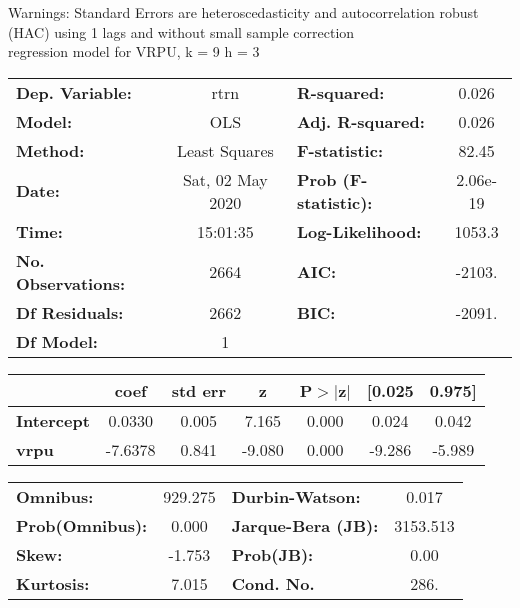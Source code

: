 Warnings: \newline
 [1] Standard Errors are heteroscedasticity and autocorrelation robust (HAC) using 1 lags and without small sample correction\\ 

regression model for VRPU, k = 9 h = 3\begin{center}
\begin{tabular}{lclc}
\toprule
\textbf{Dep. Variable:}    &       rtrn       & \textbf{  R-squared:         } &     0.026   \\
\textbf{Model:}            &       OLS        & \textbf{  Adj. R-squared:    } &     0.026   \\
\textbf{Method:}           &  Least Squares   & \textbf{  F-statistic:       } &     82.45   \\
\textbf{Date:}             & Sat, 02 May 2020 & \textbf{  Prob (F-statistic):} &  2.06e-19   \\
\textbf{Time:}             &     15:01:35     & \textbf{  Log-Likelihood:    } &    1053.3   \\
\textbf{No. Observations:} &        2664      & \textbf{  AIC:               } &    -2103.   \\
\textbf{Df Residuals:}     &        2662      & \textbf{  BIC:               } &    -2091.   \\
\textbf{Df Model:}         &           1      & \textbf{                     } &             \\
\bottomrule
\end{tabular}
\begin{tabular}{lcccccc}
                   & \textbf{coef} & \textbf{std err} & \textbf{z} & \textbf{P$> |$z$|$} & \textbf{[0.025} & \textbf{0.975]}  \\
\midrule
\textbf{Intercept} &       0.0330  &        0.005     &     7.165  &         0.000        &        0.024    &        0.042     \\
\textbf{vrpu}      &      -7.6378  &        0.841     &    -9.080  &         0.000        &       -9.286    &       -5.989     \\
\bottomrule
\end{tabular}
\begin{tabular}{lclc}
\textbf{Omnibus:}       & 929.275 & \textbf{  Durbin-Watson:     } &    0.017  \\
\textbf{Prob(Omnibus):} &   0.000 & \textbf{  Jarque-Bera (JB):  } & 3153.513  \\
\textbf{Skew:}          &  -1.753 & \textbf{  Prob(JB):          } &     0.00  \\
\textbf{Kurtosis:}      &   7.015 & \textbf{  Cond. No.          } &     286.  \\
\bottomrule
\end{tabular}
\end{center}


